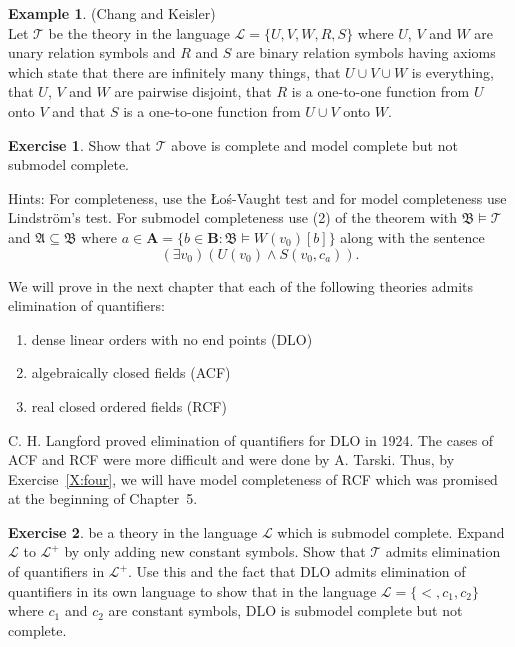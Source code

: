 \documentclass[titlepage, oneside]{amsbook}
\theoremstyle{plain}
\theoremstyle{definition}
\newtheorem{exercise}{Exercise}
\newtheorem{examples}{Example}
\theoremstyle{remark}
\newcommand{\bmt}{\ensuremath{\mathfrak B \models \mathcal T }}
\newcommand{\tee}{\ensuremath{\mathcal{T}}}
\newcommand{\lan}{\ensuremath{\mathcal{L}}}
\newcommand{\seq}{\ensuremath{\subseteq}}
\newcommand{\ma}{\ensuremath{\mathfrak{A}}}
\newcommand{\mb}{\ensuremath{\mathfrak{B}}}
\newcommand{\ba}{\ensuremath{\mathbf{A}}}
\newcommand{\bb}{\ensuremath{\mathbf{B}}}
\begin{document}
\begin{examples} (Chang and Keisler)\\
  Let $\tee$ be the theory in the language $\lan = \{ U, V, W, R, S \}$
where $U$, $V$ and $W$ are unary relation symbols and $R$ and $S$ are
binary relation symbols having  axioms which state that there are
infinitely many things, that $U \cup V \cup W$ is everything, that $U$,
$V$ and $W$ are pairwise disjoint, that $R$ is a one-to-one function
from $U$ onto $V$ and that $S$ is a one-to-one function from $U \cup V$
onto $W$.\end{examples}

\begin{exercise}  Show that $\tee$ above is complete and model complete
but not submodel complete.

Hints:  For completeness, use the  {\L}o\'{s}-Vaught test and for model
completeness use Lindstr\"{o}m's test.  For submodel completeness use
(2) of the theorem with $\bmt$ and $\ma \seq \mb$ where $a \in \ba = \{
b \in \bb : \mb \models W(v_0) [b] \}$ along with the sentence \[ (
\exists v_0 ) ( U
(v_0 ) \wedge S ( v_0 , c_a )). \]

\end{exercise}

We will prove in the next chapter that each of the following theories admits 
elimination of quantifiers:
\begin{enumerate}
\item dense linear orders with no end points (DLO)
\item algebraically closed fields (ACF)
\item real closed ordered fields (RCF)
\end{enumerate}


C. H. Langford proved elimination of quantifiers for DLO in 1924.  The
cases of ACF and RCF were more difficult and were done by A. Tarski.
Thus, by Exercise~\ref{X:four}, we will have model completeness of 
RCF which was promised at the beginning of Chapter~5.

\begin{exercise}\label{E:addconstants} be a theory in the language $\lan$
which is submodel complete. Expand $\lan$ to $\lan^{+}$ by only adding new constant symbols. 
Show that $\tee$ admits elimination of quantifiers in $\lan^{+}$. 
Use this and the fact that DLO admits elimination of quantifiers in its own language to show that in the language 
$\lan = \{ < , c_1 , c_2 \}$ where $c_1$ and $c_2$ are constant symbols, DLO is submodel complete but not complete.
\end{exercise}
\end{document}
